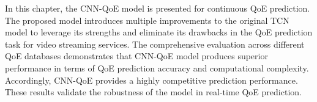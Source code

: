 In this chapter, the CNN-QoE model is presented for continuous QoE prediction.
The proposed model introduces multiple improvements to the original TCN model to leverage its strengths and eliminate its drawbacks in the QoE prediction task for video streaming services.
The comprehensive evaluation across different QoE databases demonstrates that CNN-QoE model produces superior performance in terms of QoE prediction accuracy and computational complexity.
Accordingly, CNN-QoE provides a highly competitive prediction performance.
These results validate the robustness of the model in real-time QoE prediction.